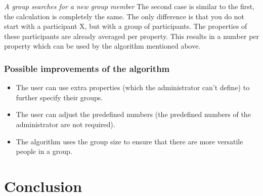 \documentclass[]{article}
\begin{document}
\emph{A group searches for a new group member}
The second case is similar to the first, the calculation is completely the same.
The only difference is that you do not start with a participant X, but with a group of participants.
The properties of these participants are already averaged per property.
This results in a number per property which can be used by the algorithm mentioned above.

\subsubsection{Possible improvements of the algorithm}
\begin{itemize}
\item The user can use extra properties (which the administrator can't define) to further specify their groups.
\item The user can adjust the predefined numbers (the predefined numbers of the administrator are not required).
\item The algorithm uses the group size to ensure that there are more versatile people in a group.
\end{itemize}

\section{Conclusion}

\newpage


\end{document}
